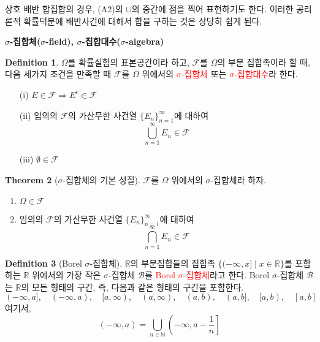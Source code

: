 \documentclass{article}
\theoremstyle{definition}
\newtheorem{theorem}{Theorem}
\newtheorem{definition}[theorem]{Definition}
\begin{document}
\noindent
상호 배반 합집합의 경우, (A2)의 $\cup$의 중간에 점을 찍어 표현하기도 한다. 이러한 공리론적 확률덕분에 배반사건에 대해서 합을 구하는 것은 상당히 쉽게 된다.

\newpage

\noindent
\textbf{$\sigma$-집합체($\sigma$-field), $\sigma$-집합대수($\sigma$-algebra)}

\begin{definition}
    $\Omega$를 확률실험의 표본공간이라 하고, $\mathcal{F}$를 $\Omega$의 부분 집합족이라 할 때, 다음 세가지 조건을 만족할 때 $\mathcal{F}$를 $\Omega$ 위에서의 \textcolor{red}{$\sigma$-집합체} 또는 \textcolor{red}{$\sigma$-집합대수}라 한다.

    \begin{enumerate}
        \item[(i)] $E \in \mathcal{F} \Rightarrow E^c \in \mathcal{F}$
        \item[(ii)] 임의의 $\mathcal{F}$의 가산무한 사건열 $\{E_n\}_{n=1}^\infty$에 대하여
        \begin{equation*}
            \bigcup_{n=1}^\infty E_n \in \mathcal{F}
        \end{equation*}

        \item[(iii)] $\emptyset \in \mathcal{F}$
    \end{enumerate}
\end{definition}

\begin{theorem}[$\sigma$-집합체의 기본 성질]
    $\mathcal{F}$를 $\Omega$ 위에서의 $\sigma$-집합체라 하자.

    \begin{enumerate}
        \item $\Omega \in \mathcal{F}$
        \item 임의의 $\mathcal{F}$의 가산무한 사건열 $\{E_n\}_{n=1}^\infty$에 대하여
        \begin{equation*}
            \bigcap_{n=1}^\infty E_n \in \mathcal{F}
        \end{equation*}
    \end{enumerate}
\end{theorem}

\begin{definition}[Borel $\sigma$-집합체]
    \(\mathbb{R}\)의 부분집합들의 집합족 \(\{(-\infty, x] \mid x \in \mathbb{R} \}\)를 포함하는 \(\mathbb{R}\) 위에서의 가장 작은 \(\sigma\)-집합체 \(\mathcal{B}\)를 \textcolor{red}{Borel \(\sigma\)-집합체}라고 한다. 
    Borel \(\sigma\)-집합체 \(\mathcal{B}\)는 \(\mathbb{R}\)의 모든 형태의 구간, 즉, 다음과 같은 형태의 구간을 포함한다.
    \begin{equation*}
        (-\infty, a], \quad (-\infty, a), \quad [a, \infty), \quad (a, \infty), \quad (a, b), \quad  (a, b], \quad [a, b), \quad [a, b]
    \end{equation*}
    여기서,
    \begin{equation*}
        (-\infty, a) = \bigcup_{n \in \mathbb{N}} \left(-\infty, a - \dfrac{1}{n} \right]
    \end{equation*}
\end{definition}
\end{document}
